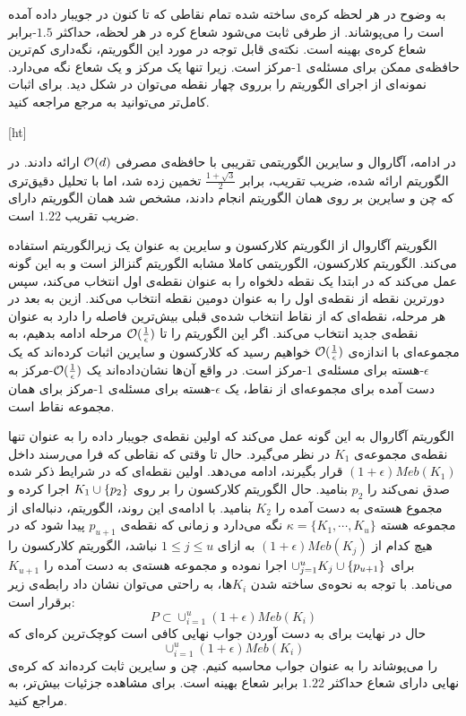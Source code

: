 به وضوح در هر لحظه کره‌ی ساخته شده تمام نقاطی که تا کنون در جویبار داده آمده‌ است را می‌پوشاند. از طرفی ثابت می‌شود شعاع کره در هر لحظه، حداکثر $1.5$-برابر شعاع کره‌ی بهینه است. نکته‌ی قابل توجه در مورد این الگوریتم، نگه‌داری کم‌ترین حافظه‌ی ممکن برای مسئله‌ی $1$-مرکز است. زیرا تنها یک مرکز و یک شعاع نگه می‌دارد. نمونه‌ای از‌ اجرای الگوریتم را برروی چهار نقطه می‌توان در شکل  دید. برای اثبات کامل‌تر می‌توانید به مرجع  مراجعه کنید. 

[ht]


در ادامه، آگاروال و سایرین  الگوریتمی تقریبی با حافظه‌ی مصرفی $\mathcal{O}(d)$ ارائه دادند. در الگوریتم ارائه شده، ضریب تقریب، برابر $\frac{1 + \sqrt{3}}{2}$  تخمین زده شد، اما با تحلیل دقیق‌تری که چن و سایرین  بر روی همان الگوریتم انجام دادند، مشخص شد همان الگوریتم دارای ضریب تقریب $1.22$ است.

الگوریتم آگاروال از الگوریتم کلارکسون و سایرین  به عنوان یک زیرالگوریتم استفاده می‌کند. الگوریتم کلارکسون، الگوریتمی کاملا مشابه الگوریتم گنزالز است و به این گونه عمل می‌کند که در ابتدا یک نقطه دلخواه را به عنوان نقطه‌ی اول انتخاب می‌کند، سپس دورترین نقطه از‌ نقطه‌ی اول را به عنوان دومین نقطه انتخاب می‌کند. ازین به بعد در هر مرحله، نقطه‌ای که از نقاط انتخاب شده‌ی قبلی بیش‌ترین فاصله را دارد به عنوان نقطه‌ی جدید انتخاب می‌کند. اگر این الگوریتم را تا $\mathcal{O}(\frac{1}{\epsilon})$ مرحله ادامه بدهیم، به مجموعه‌ای با اندازه‌ی $\mathcal{O}(\frac{1}{\epsilon})$ خواهیم رسید که  کلارکسون و سایرین اثبات کرده‌اند که یک $\epsilon$-هسته برای مسئله‌ی $1$-مرکز‌ است. در واقع آن‌ها نشان‌داده‌اند یک $\mathcal{O}(\frac{1}{\epsilon})$-مرکز به دست آمده برای مجموعه‌ای از نقاط، یک $\epsilon$-هسته برای مسئله‌ی $1$-مرکز برای همان مجموعه نقاط است.

الگوریتم آگاروال به این گونه عمل می‌کند که اولین نقطه‌ی جویبار داده را به عنوان تنها نقطه‌ی مجموعه‌ی $K_1$ در نظر می‌گیرد. حال تا وقتی که نقاطی که فرا می‌رسند داخل $(1 + \epsilon)Meb(K_1)$ قرار بگیرند، ادامه می‌دهد. اولین نقطه‌ای که در شرایط‌ ذکر شده صدق نمی‌کند را $p_2$ بنامید. حال الگوریتم کلارکسون را بر روی $K_1 \cup \left\{ p_2 \right\}$ اجرا کرده و مجموع هسته‌ی به دست آمده را $K_2$ بنامید. با ادامه‌ی این روند، الگوریتم، دنباله‌ای از مجموعه هسته $\kappa = \{ K_1, \cdots, K_u \}$ نگه می‌دارد و زمانی که نقطه‌ی $p_{u+1}$ پیدا شود که در هیچ کدام از $(1 + \epsilon)Meb(K_j)$ به ازای $1 \leq j \leq u$ نباشد، الگوریتم کلارکسون را برای $\cup_{j = 1}^{u} K_j \cup \left\{ p_{u+1} \right\}$ اجرا نموده و مجموعه هسته‌ی به دست آمده را $K_{u+1}$ می‌نامد. با توجه به نحوه‌ی ساخته شدن $K_i$ها، به راحتی می‌توان نشان داد رابطه‌ی زیر برقرار است:
$$P \subset \cup_{i=1}^u (1+\epsilon)Meb(K_i)$$
حال در نهایت برای به دست آوردن جواب نهایی کافی است کوچک‌ترین کره‌ای که 
$$\cup_{i=1}^u (1+\epsilon)Meb(K_i)$$
 را می‌پوشاند را به عنوان جواب محاسبه کنیم. چن و سایرین ثابت کرده‌اند که کره‌ی نهایی دارای شعاع حداکثر $1.22$ برابر شعاع بهینه است. برای مشاهده‌ جزئیات بیش‌تر، به  مراجع کنید.

